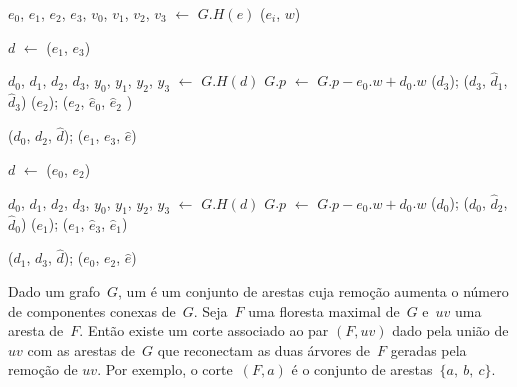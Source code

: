 \begin{algorithm}[htb]
\caption{\MSFupdate($G$, $e$, $w$)}
\label{Algo:MSFupdate}
\begin{algorithmic}[1]
	\State $e_0$, $e_1$, $e_2$, $e_3$, $v_0$, $v_1$, $v_2$, $v_3$ $\gets$ $G.H(e)$ \label{Algo:MSFupdate:linha:const1}
 \label{Algo:MSFupdate:linha:laçosetpeso}
\State  \LCOAddCost($e_i$, $w$) \label{Algo:MSFupdate:linha:LCOAddCost}
\EndFor

\label{Algo:MSFupdate:linha:if} 
\State $d$ $\gets$ \LCOMin($e_1$, $e_3$)\label{Algo:MSFupdate:linhamin}

\State $d_0$, $d_1$, $d_2$, $d_3$, $y_0$, $y_1$, $y_2$, $y_3$ $\gets$ $G.H(d)$ \label{Algo:MSFupdate:linha:const2}
\label{Algo:MSFupdate:linha:compara}
\State $G$.$p$ $\gets$ $G.p-e_0.w+d_0$.$w$ \label{Algo:MSFupdate:linha:atualizaPeso}
\State \LCOCycle($d_3$); \LCOSplit($d_3$, $\hat d_1$, $\hat d_3$)
\State \LCOCycle($e_2$); \LCOSplit($e_2$, $\hat e_0$, $\hat e_2$ )\label{Algo:MSFupdate:linhasplit}

\State \LCOMerge($d_0$, $d_2$, $\hat d$); \LCOMerge($e_1$, $e_3$, $\hat e$)\label{Algo:MSFupdate:linhas:Merge}

\EndIf

\Else{}
\State $d$ $\gets$ \LCOMax($e_0$, $e_2$)\label{Algo:MSFupdate:dualinicio}

\State $d_0$, $d_1$, $d_2$, $d_3$, $y_0$, $y_1$, $y_2$, $y_3$ $\gets$ $G.H(d)$\label{Algo:MSFupdate:linha:const3}
\State $G$.$p$ $\gets$ $G$.$p-e_0.w+d_0$.$w$\label{Algo:MSFupdate:linha:const4}
\State \LCOCycle($d_0$); \LCOSplit($d_0$, $\hat d_2$, $\hat d_0$)
\State \LCOCycle($e_1$); \LCOSplit($e_1$, $\hat e_3$, $\hat e_1$)

\State \LCOMerge($d_1$, $d_3$, $\hat d$); \LCOMerge($e_0$, $e_2$, $\hat e$)

\EndIf
\EndIf\label{Algo:MSFupdate:dualfim}
\end{algorithmic}
\end{algorithm}

Dado um grafo~$G$, um  é um conjunto de arestas cuja remoção aumenta o número de componentes conexas de~$G$.
Seja~$F$ uma floresta maximal de~$G$ e~$uv$ uma aresta de~$F$.
Então existe um corte associado ao par $(F, uv)$ dado pela união de $uv$ com as arestas de~$G$ que reconectam as duas árvores de~$F$ geradas pela remoção de $uv$.
Por exemplo, o corte~$(F, a)$ é o conjunto de arestas~$\{a,~b,~c\}$.

